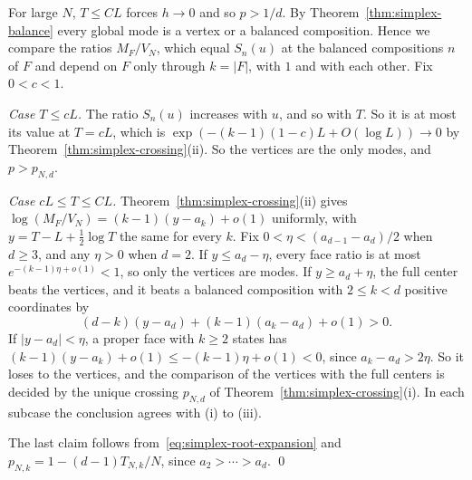 For large $N$, $T\le CL$ forces $h\to0$ and so $p>1/d$. By
Theorem~\ref{thm:simplex-balance} every global mode is a vertex or a balanced
composition. Hence we compare the ratios $M_F/V_N$, which equal $S_n(u)$ at the balanced
compositions $n$ of $F$ and depend on $F$ only through $k=\lvert F\rvert$, with $1$ and with each
other. Fix $0<c<1$.

\emph{Case $T\le cL$.} The ratio $S_n(u)$ increases with $u$, and so with $T$. So it is at most
its value at $T=cL$, which is $\exp(-(k-1)(1-c)L+O(\log L))\to0$ by
Theorem~\ref{thm:simplex-crossing}(ii). So the vertices are the only modes, and $p>p_{N,d}$.

\emph{Case $cL\le T\le CL$.} Theorem~\ref{thm:simplex-crossing}(ii) gives
$\log(M_F/V_N)=(k-1)(y-a_k)+o(1)$ uniformly, with $y=T-L+\frac12\log T$ the same for every $k$.
Fix $0<\eta<(a_{d-1}-a_d)/2$ when $d\ge3$, and any $\eta>0$ when $d=2$.
If $y\le a_d-\eta$, every face ratio is at most
$e^{-(k-1)\eta+o(1)}<1$, so only the vertices are modes. If
$y\ge a_d+\eta$, the full center beats the vertices, and it beats a
balanced composition with $2\le k<d$ positive coordinates by
\[
(d-k)(y-a_d)+(k-1)(a_k-a_d)+o(1)>0 .
\]
If $|y-a_d|<\eta$, a proper face with $k\ge2$ states has
$(k-1)(y-a_k)+o(1)\le-(k-1)\eta+o(1)<0$, since $a_k-a_d>2\eta$. So it
loses to the vertices, and the comparison of the vertices with the full centers
is decided by the unique crossing $p_{N,d}$ of Theorem~\ref{thm:simplex-crossing}(i).
In each subcase the conclusion agrees with (i) to (iii).

The last claim follows from~\eqref{eq:simplex-root-expansion} and
$p_{N,k}=1-(d-1)T_{N,k}/N$, since $a_2>\cdots>a_d$. \qed
